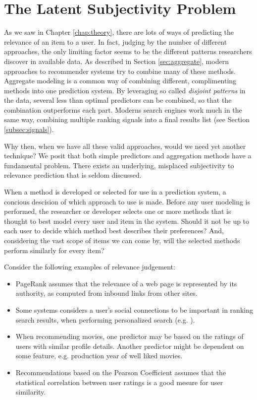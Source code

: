 \section{The Latent Subjectivity Problem}
\label{sec:reasoning}

As we saw in Chapter \ref{chap:theory}, 
there are lots of ways of predicting the
relevance of an item to a user. 
In fact, judging by the number of different approaches,
the only limiting factor seems to be the different 
patterns researchers discover in available data.
As described in Section \ref{sec:aggregate},
modern approaches to recommender systems try to combine many of these methods.
Aggregate modeling is a common way of combining different, complimenting
methods into one prediction system.
By leveraging so called \emph{disjoint patterns}
in the data, several less than optimal predictors
can be combined, so that the combination outperforms each part.
Moderns search engines work much in the same way,
combining multiple ranking signals into a final results list
(see Section \ref{subsec:signals}).

Why then, when we have all these valid approaches, would we need yet another technique?
We posit that both simple predictors and aggregation methods have a fundamental problem.
There exists an underlying, misplaced subjectivity to relevance prediction that is seldom discussed.

When a method is developed or selected for use in a prediction system,
a concious descision of which approach to use is made.
Before any user modeling is performed, the researcher or developer selects
one or more methods that is thought to best model every user and item in the system.
Should it not be up to each user to decide which method best describes their preferences?
And, considering the vast scope of items we can come by, will the selected
methods perform similarly for every item?

Consider the following examples of relevance judgement:

\begin{itemize}
  \item PageRank \citep{Bender2005} assumes that the relevance of a web page is 
  represented by its authority, as computed from inbound links from other sites.
  \item Some systems considers a user's social connections to be important
  in ranking search results, when performing personalized search (e.g. \cite{Carmel2009}).
  \item When recommending movies, one predictor may be based on the ratings
  of users with similar profile details. Another predictor might be 
  dependent on some feature, e.g. production year of well liked movies.
  \item Recommendations based on the Pearson Coefficient \cite[p11]{Segaran2007}
  assumes that the statistical correlation between user ratings is a good
  mesure for user similarity.
\end{itemize}


